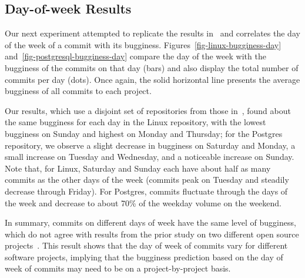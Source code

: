\subsection{Day-of-week Results}
\label{sec-day-of-week}
Our next experiment attempted to replicate the results
in~\cite{sliwerski-msr-2005} and correlates the day of the week
of a commit with its bugginess. Figures~\ref{fig-linux-bugginess-day} 
and~\ref{fig-postgresql-bugginess-day} compare the day of the week
with the bugginess of the commits on that day (bars) and also display
the total number of commits per day (dots). Once again, the solid
horizontal line presents the average bugginess of all commits to
each project.

Our results, which use a disjoint set of repositories from those
in~\cite{sliwerski-msr-2005}, found about the same bugginess for each
day in the Linux repository, with the lowest bugginess on Sunday and
highest on Monday and Thursday; for the Postgres repository, we
observe a slight decrease in bugginess on Saturday and Monday, a small
increase on Tuesday and Wednesday, and a noticeable increase on
Sunday.  Note that, for Linux, Saturday and Sunday each have about
half as many commits as the other days of the week (commits peak on
Tuesday and steadily decrease through Friday). For Postgres, commits
fluctuate through the days of the week and decrease to about 70\% of
the weekday volume on the weekend.

In summary, commits on different days of week have the same level of bugginess, which
do not agree with results from the prior study on two different open source projects~\cite{sliwerski-msr-2005}.  
This result shows that the day of week of commits
vary for different software projects, implying that the bugginess prediction based on 
the day of week of commits may need to be on a project-by-project basis.


